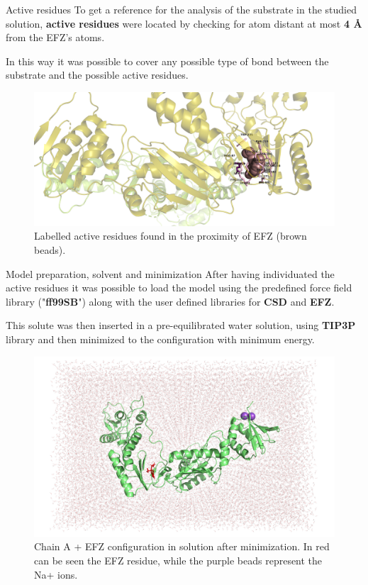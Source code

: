 \documentclass{beamer}
\begin{document}
\begin{frame}{Active residues}
    To get a reference for the analysis of the substrate in the studied solution, \textbf{active residues}  were located by checking for atom distant at most \textbf{4 \AA}  from the EFZ's atoms.

    In this way it was possible to cover any possible type of bond between the substrate and the possible active residues.
\end{frame}

\begin{frame}
    \begin{figure}
        \centering
        \includegraphics[width=\textwidth]{../figures/act_res.png}
        \caption{Labelled active residues found in the proximity of EFZ (brown beads).  \label{fig:actres}}
    \end{figure}
\end{frame}

\begin{frame}{Model preparation, solvent and minimization}
    After having individuated the active residues it was possible to load the model using the predefined force field library ("\textbf{ff99SB}") along with the user defined libraries for \textbf{CSD}  and \textbf{EFZ}.

    This solute was then inserted in a pre-equilibrated water solution, using \textbf{TIP3P} library and then minimized to the configuration with minimum energy.
\end{frame}

\begin{frame}
    \begin{figure}
        \centering
        \includegraphics[width=0.8\linewidth, clip, trim= 0 0 0 0]{../figures/chain_a_efz_solv.png}
        \caption{Chain A + EFZ configuration in solution after minimization. In red can be seen the EFZ residue, while the purple beads represent the Na+ ions. \label{fig:chain_a_efz_solv}}
    \end{figure}
\end{frame}
\end{document}
